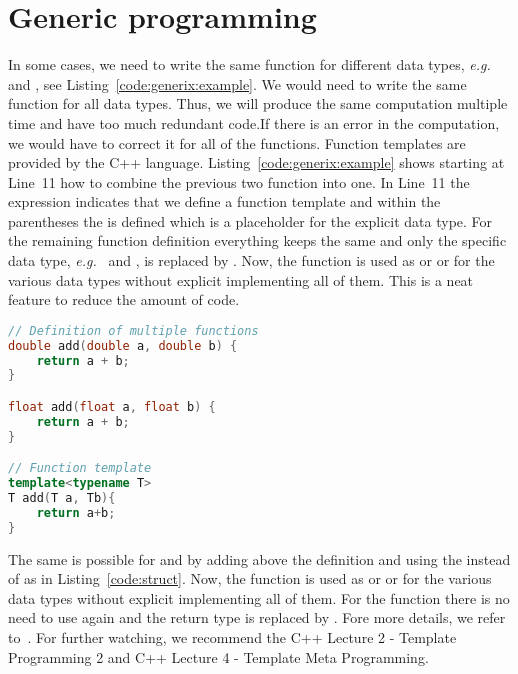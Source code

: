 \section{Generic programming}
\label{sec:generic:programming}
In some cases, we need to write the same function for different data types, \emph{e.g.}\  and , see Listing~\ref{code:generix:example}. We would need to write the same function for all data types. Thus, we will produce the same computation multiple time and have too much redundant code.If there is an error in the computation, we would have to correct it for all of the functions. Function templates are provided by the C++ language. Listing~\ref{code:generix:example} shows starting at Line~11 how to combine the previous two function into one. In Line~11 the expression  indicates that we define a function template and within the parentheses the  is defined which is a placeholder for the explicit data type. For the remaining function definition everything keeps the same and only the specific data type, \emph{e.g.}\  and , is replaced by . Now, the function is used as  or  or  for the various data types without explicit implementing all of them. This is a neat feature to reduce the amount of code.\\

\begin{lstlisting}[language=c++,caption={Example for the usage function templates.
\label{code:generix:example}},float,floatplacement=tb]
// Definition of multiple functions
double add(double a, double b) {
	return a + b;
}

float add(float a, float b) {
	return a + b;
}

// Function template
template<typename T>
T add(T a, Tb){
	return a+b;
}
\end{lstlisting}

The same is possible for  and  by adding  above the definition and using the  instead of  as in Listing~\ref{code:struct}.  Now, the function is used as  or  or  for the various data types without explicit implementing all of them. For the function  there is no need to use  again and the return type  is replaced by . Fore more details, we refer to~\cite{josuttis2003c++}. For further watching, we recommend the C++ Lecture 2 - Template Programming 2 and C++ Lecture 4 - Template Meta Programming.

